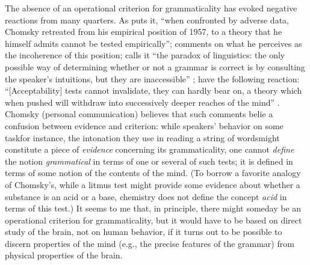 The absence of an operational criterion for grammaticality has evoked negative reactions from many quarters.  As \citet{Reich1969} puts it, ``when confronted by adverse data, Chomsky retreated from his empirical position of 1957, to a theory that he himself admits cannot be tested empirically''; \citet{Marks1967} comments on what he perceives as the incoherence of this position; \citet[365, fn. 1]{Householder1973} calls it ``the paradox of linguistics: the only possible way of determining whether or not a grammar is correct is by consulting the speaker's intuitions, but they are inaccessible''%
; \citet[25]{GleitmanEtAl1970} have the following reaction: ``[Acceptability] tests cannot invalidate, they can hardly bear on, a theory which when pushed will withdraw into successively deeper reaches of the mind''%
. Chomsky (personal communication) believes that such comments belie a confusion between evidence and criterion: while speakers' behavior on some task\schdash{}for instance, the intonation they use in reading a string of words\schdash{}might constitute a piece of \textit{evidence} concerning its grammaticality, one cannot \textit{define} the notion \textit{grammatical} in terms of one or several of such tests; it is defined in terms of some notion of the contents of the mind. (To borrow a favorite analogy of Chomsky's, while a litmus test might provide some evidence about whether a substance is an acid or a base, chemistry does not define the concept \textit{acid} in terms of this test.) It seems to me that, in principle, there might someday be an operational criterion for grammaticality, but it would have to be based on direct study of the brain, not on human behavior, if it turns out to be possible to discern properties of the mind (e.g., the precise features of the grammar) from physical properties of the brain.

